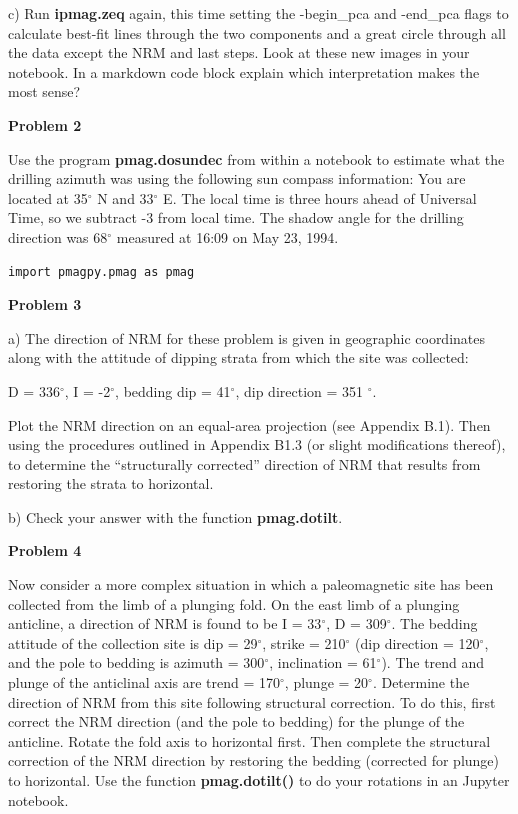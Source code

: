 {c) Run  {\bf ipmag.zeq} again, this time setting the -begin\_pca and -end\_pca flags to calculate best-fit lines through the two components and a great circle through all the data except the NRM and last steps.  Look at these new images in your notebook.  In a markdown code block explain which interpretation makes the most sense?  


{\bf Problem 2 }

 Use the program {\bf pmag.dosundec}  from within a notebook   to estimate what the drilling azimuth was using the following sun compass information:   You are located at 35$^{\circ}$ N and 33$^{\circ}$ E.  The local
time is three hours ahead of Universal Time, so we subtract -3 from local time.  The shadow angle for the
drilling direction was 68$^{\circ}$ measured at 16:09 on May 23, 1994.

\begin{verbatim}
import pmagpy.pmag as pmag
\end{verbatim}

{\bf Problem 3}

a) The direction of NRM  for these problem is given in geographic coordinates along with the
attitude of dipping strata from which the site was collected:    

D = 336$^{\circ}$, I = -2$^{\circ}$, bedding dip = 41$^{\circ}$, dip direction = 351 $^{\circ}$.  

Plot the NRM direction on an equal-area
projection (see Appendix B.1).   Then using the procedures outlined in Appendix B1.3 (or slight modifications thereof), to determine
the ``structurally corrected'' direction of NRM that results from restoring the strata to horizontal.

b) Check your answer with the function {\bf pmag.dotilt}. 


{\bf Problem 4}

Now consider a more complex situation in which a paleomagnetic site has been collected from the
limb of a plunging fold. On the east limb of a plunging anticline, a direction of NRM is found to be
I = 33$^{\circ}$, D = 309$^{\circ}$. The bedding attitude of the collection site is dip = 29$^{\circ}$, strike = 210$^{\circ}$ (dip direction = 120$^{\circ}$, and the pole to bedding is azimuth = 300$^{\circ}$, inclination = 61$^{\circ}$). The trend and plunge of the
anticlinal axis are trend = 170$^{\circ}$, plunge = 20$^{\circ}$. Determine the direction of NRM from this site following
structural correction. To do this, first correct the NRM direction (and the pole to bedding) for the
plunge of the anticline. Rotate the fold axis to horizontal first. Then complete the structural correction of the NRM direction by restoring
the bedding (corrected for plunge) to horizontal.   Use the function {\bf pmag.dotilt() }  to do your rotations in an Jupyter notebook.    






}
